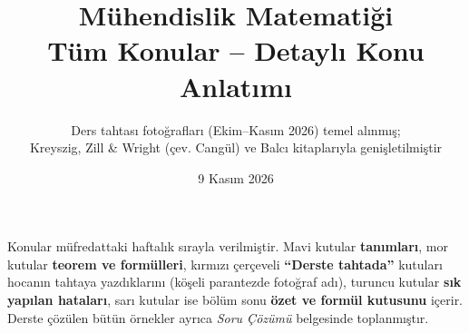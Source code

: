 \documentclass[11pt]{article}
\title{\color{ana}\textbf{Mühendislik Matematiği}\\[4pt]\Large Tüm Konular -- Detaylı Konu Anlatımı}
\author{Ders tahtası fotoğrafları (Ekim--Kasım 2026) temel alınmış;\\ Kreyszig, Zill \& Wright (çev. Cangül) ve Balcı kitaplarıyla genişletilmiştir}
\date{9 Kasım 2026}
\begin{document}
\maketitle
\thispagestyle{empty}
\begin{bilgi}
Konular müfredattaki haftalık sırayla verilmiştir. Mavi kutular \textbf{tanımları}, mor kutular \textbf{teorem ve formülleri}, kırmızı çerçeveli \textbf{``Derste tahtada''} kutuları hocanın tahtaya yazdıklarını (köşeli parantezde fotoğraf adı), turuncu kutular \textbf{sık yapılan hataları}, sarı kutular ise bölüm sonu \textbf{özet ve formül kutusunu} içerir. Derste çözülen bütün örnekler ayrıca \emph{Soru Çözümü} belgesinde toplanmıştır.
\end{bilgi}
\tableofcontents
\clearpage
\clearpage
\clearpage
\clearpage
\clearpage
\clearpage
\end{document}
